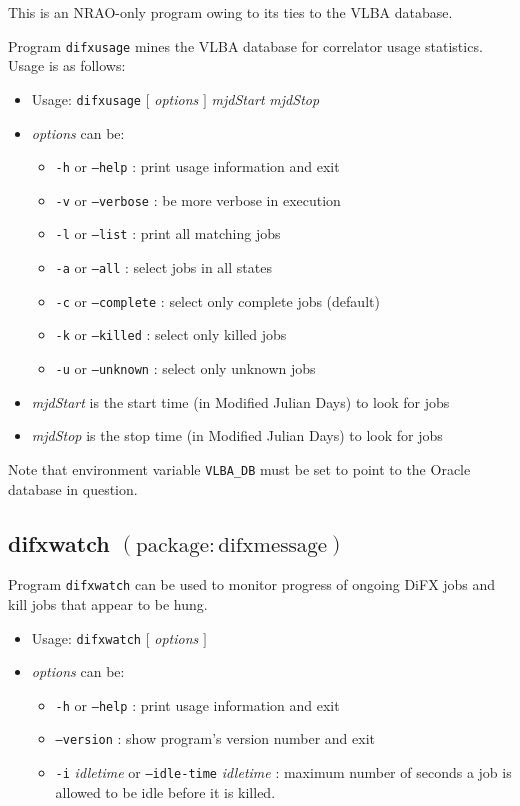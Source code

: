 This is an NRAO-only program owing to its ties to the VLBA database.

Program {\tt difxusage} mines the VLBA database for correlator usage statistics.
Usage is as follows:

\begin{itemize}
\item[] Usage: {\tt difxusage} $[$ {\em options} $]$ {\em mjdStart} {\em mjdStop}
\item[] {\em options} can be:
\begin{itemize}
\item[] {\tt -h} or {\tt --help} : print usage information and exit
\item[] {\tt -v} or {\tt --verbose} : be more verbose in execution
\item[] {\tt -l} or {\tt --list} : print all matching jobs
\item[] {\tt -a} or {\tt --all} : select jobs in all states
\item[] {\tt -c} or {\tt --complete} : select only complete jobs (default)
\item[] {\tt -k} or {\tt --killed} : select only killed jobs
\item[] {\tt -u} or {\tt --unknown} : select only unknown jobs
\end{itemize}
\item[] {\em mjdStart} is the start time (in Modified Julian Days) to look for jobs
\item[] {\em mjdStop} is the stop time (in Modified Julian Days) to look for jobs
\end{itemize}

\noindent
Note that environment variable {\tt VLBA\_DB} must be set to point to the Oracle database in question.







\subsection{difxwatch {\small $\mathrm{(package: difxmessage)}$}} \label{sec:difxwatch} 

Program {\tt difxwatch} can be used to monitor progress of ongoing DiFX jobs and kill jobs that appear to be hung.

\begin{itemize}
\item[] Usage: {\tt difxwatch} $[$ {\em options} $]$ 
\item[] {\em options} can be:
\begin{itemize}
\item[] {\tt -h} or {\tt --help} : print usage information and exit
\item[] {\tt --version} : show program's version number and exit
\item[] {\tt -i} {\em idletime} or {\tt --idle-time} {\em idletime} : maximum number of seconds a job is allowed to be idle before it is killed.
\end{itemize}
\end{itemize}





